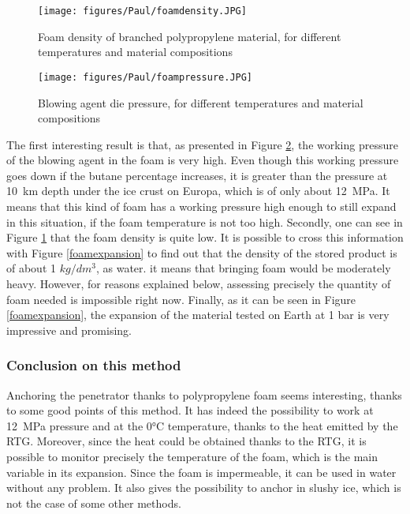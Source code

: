 \begin{figure}[H]
\begin{center}
\texttt{[image: figures/Paul/foamdensity.JPG]}
\end{center}
\caption{Foam density of branched polypropylene material, for different temperatures and material compositions}
\label{foamdensity}
\end{figure}

\begin{figure}[H]
\begin{center}
\texttt{[image: figures/Paul/foampressure.JPG]}
\end{center}
\caption{Blowing agent die pressure, for different temperatures and material compositions}
\label{foampressure}
\end{figure}


The first interesting result is that, as presented in Figure \ref{foampressure}, the working pressure of the blowing agent in the foam is very high. Even though this working pressure goes down if the butane percentage increases, it is greater than the pressure at 10~km depth under the ice crust on Europa, which is of only about 12~MPa. It means that this kind of foam has a working pressure high enough to still expand in this situation, if the foam temperature is not too high.
Secondly, one can see in Figure \ref{foamdensity} that the foam density is quite low. It is possible to cross this information with Figure \ref{foamexpansion} to find out that the density of the stored product is of about 1 $kg/dm^{3}$, as water. it means that bringing foam would be moderately heavy. However, for reasons explained below, assessing precisely the quantity of foam needed is impossible right now. Finally, as it can be seen in Figure \ref{foamexpansion}, the expansion of the material tested on Earth at 1 bar is very impressive and promising.

\subsubsection{Conclusion on this method}

Anchoring the penetrator thanks to polypropylene foam seems interesting, thanks to some good points of this method. It has indeed the possibility to work at 12~MPa pressure and at the 0°C temperature, thanks to the heat emitted by the RTG. Moreover, since the heat could be obtained thanks to the RTG, it is possible to monitor precisely the temperature of the foam, which is the main variable in its expansion. Since the foam is impermeable, it can be used in water without any problem. It also gives the possibility to anchor in slushy ice, which is not the case of some other methods.



